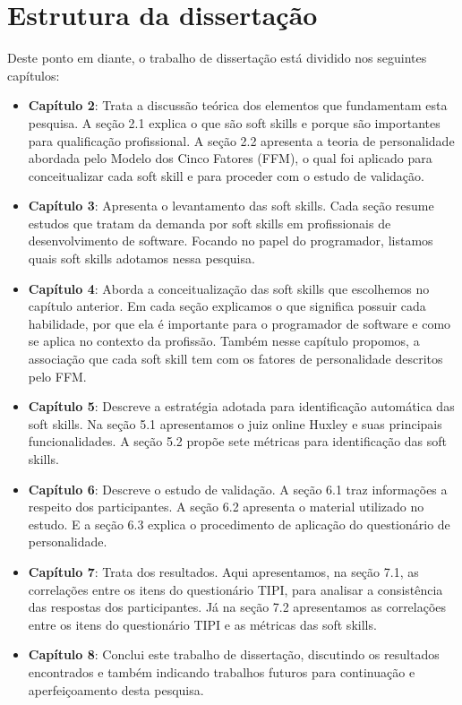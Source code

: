 \section{Estrutura da dissertação}

Deste ponto em diante, o trabalho de dissertação está dividido nos seguintes capítulos:

\begin{itemize}

	\item \textbf{Capítulo 2}: Trata a discussão teórica dos elementos que fundamentam esta pesquisa. A seção 2.1 explica o que são soft skills e porque são importantes para qualificação profissional. A seção 2.2 apresenta a teoria de personalidade abordada pelo Modelo dos Cinco Fatores (FFM), o qual foi aplicado para conceitualizar cada soft skill e para proceder com o estudo de validação.

	\item \textbf{Capítulo 3}: Apresenta o levantamento das soft skills. Cada seção resume estudos que tratam da demanda por soft skills em profissionais de desenvolvimento de software. Focando no papel do programador, listamos quais soft skills adotamos nessa pesquisa.

	\item \textbf{Capítulo 4}: Aborda a conceitualização das soft skills que escolhemos no capítulo anterior. Em cada seção explicamos o que significa possuir cada habilidade, por que ela é importante para o programador de software e como se aplica no contexto da profissão. Também nesse capítulo propomos, a associação que cada soft skill tem com os fatores de personalidade descritos pelo FFM.

	\item \textbf{Capítulo 5}: Descreve a estratégia adotada para identificação automática das soft skills. Na seção 5.1 apresentamos o juiz online Huxley e suas principais funcionalidades. A seção 5.2 propõe sete métricas para identificação das soft skills.

	\item \textbf{Capítulo 6}: Descreve o estudo de validação. A seção 6.1 traz informações a respeito dos participantes. A seção 6.2 apresenta o material utilizado no estudo. E a seção 6.3 explica o procedimento de aplicação do questionário de personalidade.

	\item \textbf{Capítulo 7}: Trata dos resultados. Aqui apresentamos, na seção 7.1, as correlações entre os itens do questionário TIPI, para analisar a consistência das respostas dos participantes. Já na seção 7.2 apresentamos as correlações entre os itens do questionário TIPI e as métricas das soft skills. 

	\item \textbf{Capítulo 8}: Conclui este trabalho de dissertação, discutindo os resultados encontrados e também indicando trabalhos futuros para continuação e aperfeiçoamento desta pesquisa.
	
\end{itemize}


